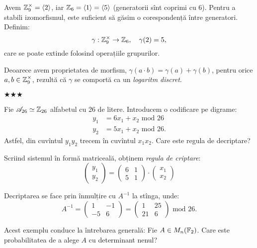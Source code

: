 Avem $ \mathbb{Z}_9^\times = \langle 2 \rangle $, iar $ \mathbb{Z}_6 = \langle 1 \rangle = \langle 5 \rangle $
(generatorii sînt coprimi cu 6). Pentru a stabili izomorfismul, este suficient
să găsim o corespondență între generatori. Definim:
\[
  \gamma : \mathbb{Z}_9^\times \to \mathbb{Z}_6, \quad \gamma(2) = 5,
\]
care se poate extinde folosind operațiile grupurilor.

Deoarece avem proprietatea de morfism, $ \gamma(a \cdot b) = \gamma(a) + \gamma(b) $,
pentru orice $ a, b \in \mathbb{Z}_9^\times $, rezultă că $ \gamma $ se comportă ca un
\emph{logaritm discret}. 

\begin{center}
  {\large $\bigstar\bigstar\bigstar$}
\end{center}

Fie $ \mathscr{A}_{26} \simeq \mathbb{Z}_{26} $ alfabetul cu 26 de litere.
Introducem o codificare pe digrame:
\begin{align*}
  y_1 &= 6x_1 + x_2 \text{ mod } 26 \\
  y_2 &= 5x_1 + x_2 \text{ mod } 26.
\end{align*}
Astfel, din cuvîntul $ y_1y_2 $ trecem în cuvîntul $ x_1x_2 $.
Care este regula de decriptare?

Scriind sistemul în formă matriceală, obținem \emph{regula de criptare}:
\[
  \begin{pmatrix}
    y_1 \\ y_2
  \end{pmatrix} = %
  \begin{pmatrix}
    6 & 1 \\ 5 & 1
  \end{pmatrix} \cdot %
  \begin{pmatrix}
    x_1 \\ x_2 
  \end{pmatrix}
\]

Decriptarea se face prin înmulțire cu $ A^{-1} $ la stînga, unde:
\[
  A^{-1} = %
  \begin{pmatrix}
    1 & -1 \\ -5 & 6
  \end{pmatrix} = %
  \begin{pmatrix}
    1 & 25 \\ 21 & 6
  \end{pmatrix} \text{ mod } 26.
\]

Acest exemplu conduce la întrebarea generală: Fie $ A \in M_n(\mathbb{F}_2) $.
Care este probabilitatea de a alege $ A $ cu determinant nenul?

